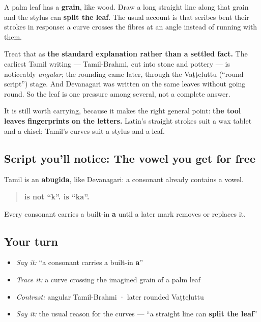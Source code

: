 A palm leaf has a \textbf{grain}, like wood. Draw a long straight line along that grain and the stylus can \textbf{split the leaf}. The usual account is that scribes bent their strokes in response: a curve crosses the fibres at an angle instead of running with them.

Treat that as \textbf{the standard explanation rather than a settled fact.} The earliest Tamil writing — Tamil-Brahmi, cut into stone and pottery — is noticeably \emph{angular}; the rounding came later, through the Vaṭṭeḻuttu (\textquotedblleft{}round script\textquotedblright{}) stage. And Devanagari was written on the same leaves without going round. So the leaf is one pressure among several, not a complete answer.

It is still worth carrying, because it makes the right general point: \textbf{the tool leaves fingerprints on the letters.} Latin's straight strokes suit a wax tablet and a chisel; Tamil's curves suit a stylus and a leaf.

\subsection*{Script you'll notice: The vowel you get for free}
Tamil is an \textbf{abugida}, like Devanagari: a consonant already contains a vowel.

\begin{quote}
\textbf{ is not \textquotedblleft{}k\textquotedblright{}.  is \textquotedblleft{}ka\textquotedblright{}.}
\end{quote}

Every consonant carries a built-in \textbf{a} until a later mark removes or replaces it.

\subsection*{Your turn}
\begin{itemize}
\raggedright
  \item \emph{Say it:} \textquotedblleft{}a consonant carries a built-in \textbf{a}\textquotedblright{}
  \item \emph{Trace it:} a curve crossing the imagined grain of a palm leaf
  \item \emph{Contrast:} angular Tamil-Brahmi · later rounded Vaṭṭeḻuttu
  \item \emph{Say it:} the usual reason for the curves — \textquotedblleft{}a straight line can \textbf{split the leaf}\textquotedblright{}
\end{itemize}

